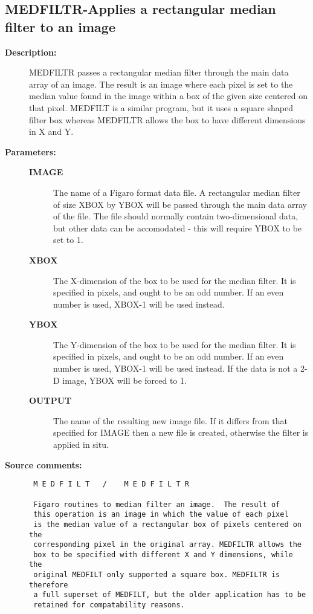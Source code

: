 \subsection{MEDFILTR-\label{MEDFILTR}Applies a rectangular median filter to an image}
\begin{description}

\item [{\bf Description:}]
 MEDFILTR passes a rectangular median filter through the main data
 array of an image. The result is an image where each pixel is set
 to the median value found in the image within a box of the given
 size centered on that pixel. MEDFILT is a similar program, but it
 uses a square shaped filter box whereas MEDFILTR allows the box to
 have different dimensions in X and Y.

\item [{\bf Parameters:}]
\begin{description}
\item [{\bf IMAGE}]
 The name of a Figaro format data file.
 A rectangular median filter of size XBOX by YBOX will
 be passed through the main data array of the file. The
 file should normally contain two-dimensional data, but
 other data can be accomodated - this will require
 YBOX to be set to 1.
\item [{\bf XBOX}]
 The X-dimension of the box to be used
 for the median filter. It is specified in pixels, and
 ought to be an odd number. If an even number is used,
 XBOX-1 will be used instead.
\item [{\bf YBOX}]
 The Y-dimension of the box to be used
 for the median filter. It is specified in pixels, and
 ought to be an odd number. If an even number is used,
 YBOX-1 will be used instead. If the data is not a 2-D
 image, YBOX will be forced to 1.
\item [{\bf OUTPUT}]
 The name of the resulting new image file. If it
 differs from that specified for IMAGE then a new
 file is created, otherwise the filter is applied in situ.
\end{description}

\item [{\bf Source comments:}]
\begin{verbatim}
 M E D F I L T   /    M E D F I L T R

 Figaro routines to median filter an image.  The result of
 this operation is an image in which the value of each pixel
 is the median value of a rectangular box of pixels centered on the
 corresponding pixel in the original array. MEDFILTR allows the
 box to be specified with different X and Y dimensions, while the
 original MEDFILT only supported a square box. MEDFILTR is therefore
 a full superset of MEDFILT, but the older application has to be
 retained for compatability reasons.


\end{verbatim}
\end{description}
